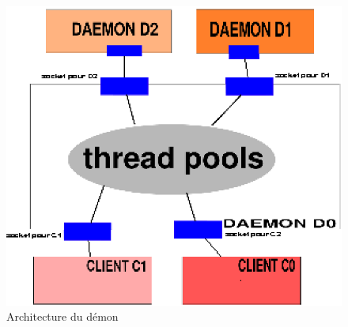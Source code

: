 \begin{center}
\begin{figure}[htbp]
    \centering
    \includegraphics[scale=1]{archi_daemon.eps}
    \caption{Architecture du démon}
    \label{client}
\end{figure}
\end{center}


